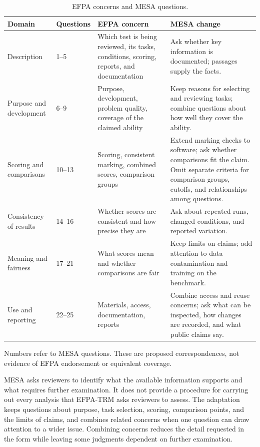 \documentclass[10pt,conference]{IEEEtran}
\begin{document}
\begin{table}[t]
\caption{EFPA concerns and MESA questions.}
\label{tab:domains}
\small
\begin{tabularx}{\textwidth}{@{}p{}p{}XX@{}}
\toprule
Domain & Questions & EFPA concern & MESA change \\
\midrule
Description & 1--5 & Which test is being reviewed, its tasks, conditions, scoring, reports, and documentation & Ask whether key information is documented; passages supply the facts. \\
Purpose and development & 6--9 & Purpose, development, problem quality, coverage of the claimed ability & Keep reasons for selecting and reviewing tasks; combine questions about how well they cover the ability. \\
Scoring and comparisons & 10--13 & Scoring, consistent marking, combined scores, comparison groups & Extend marking checks to software; ask whether comparisons fit the claim. Omit separate criteria for comparison groups, cutoffs, and relationships among questions. \\
Consistency of results & 14--16 & Whether scores are consistent and how precise they are & Ask about repeated runs, changed conditions, and reported variation. \\
Meaning and fairness & 17--21 & What scores mean and whether comparisons are fair & Keep limits on claims; add attention to data contamination and training on the benchmark. \\
Use and reporting & 22--25 & Materials, access, documentation, reports & Combine access and reuse concerns; ask what can be inspected, how changes are recorded, and what public claims say. \\
\bottomrule
\end{tabularx}
\par\smallskip
{\footnotesize Numbers refer to MESA questions. These are proposed correspondences, not evidence of EFPA endorsement or equivalent coverage.}

\end{table}

MESA asks reviewers to identify what the available information supports and what requires further examination. It does not provide a procedure for carrying out every analysis that EFPA-TRM asks reviewers to assess. The adaptation keeps questions about purpose, task selection, scoring, comparison points, and the limits of claims, and combines related concerns when one question can draw attention to a wider issue. Combining concerns reduces the detail requested in the form while leaving some judgments dependent on further examination.
\end{document}
